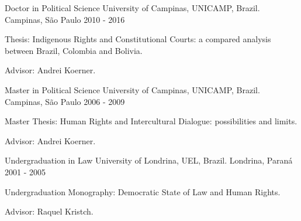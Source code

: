\begin{cventries}
\cventry
{Doctor in Political Science} %
{University of Campinas, UNICAMP, Brazil.} %
{Campinas, São Paulo} %
{2010 - 2016} %
{
  \begin{cvitems} %
    \item Thesis: Indigenous Rights and Constitutional Courts: a compared analysis between Brazil, Colombia and Bolivia.
    \item Advisor: Andrei Koerner.
  \end{cvitems}
}

\cventry
{Master in Political Science}
{University of Campinas, UNICAMP, Brazil.}
{Campinas, São Paulo}
{2006 - 2009}
{
\begin{cvitems}
  \item Master Thesis: Human Rights and Intercultural Dialogue: possibilities and limits.
  \item Advisor: Andrei Koerner.
 \end{cvitems}
}

\cventry
{Undergraduation in Law}
{University of Londrina, UEL, Brazil.}
{Londrina, Paraná}
{2001 - 2005}
{
\begin{cvitems}
  \item Undergraduation Monography: Democratic State of Law and Human Rights.
  \item Advisor: Raquel Kristch.
 \end{cvitems}
}

\end{cventries}

